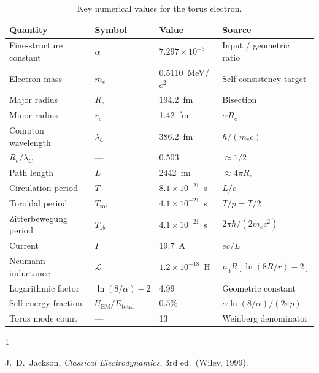 \documentclass[11pt,a4paper]{article}
\begin{document}
\begin{table}[h]
\centering
\begin{tabular}{@{}llll@{}}
\toprule
Quantity & Symbol & Value & Source \\
\midrule
Fine-structure constant & $\alpha$ & $7.297 \times 10^{-3}$ & Input / geometric ratio \\
Electron mass & $m_e$ & 0.5110~MeV/$c^2$ & Self-consistency target \\
Major radius & $R_e$ & 194.2~fm & Bisection \\
Minor radius & $r_e$ & 1.42~fm & $\alpha R_e$ \\
Compton wavelength & $\lambda_C$ & 386.2~fm & $\hbar/(m_e c)$ \\
$R_e / \lambda_C$ & --- & 0.503 & $\approx 1/2$ \\
Path length & $L$ & 2442~fm & $\approx 4\pi R_e$ \\
Circulation period & $T$ & $8.1 \times 10^{-21}$~s & $L/c$ \\
Toroidal period & $T_{\text{tor}}$ & $4.1 \times 10^{-21}$~s & $T/p = T/2$ \\
Zitterbewegung period & $T_{zb}$ & $4.1 \times 10^{-21}$~s & $2\pi\hbar/(2m_e c^2)$ \\
Current & $I$ & 19.7~A & $ec/L$ \\
Neumann inductance & $\mathcal{L}$ & $1.2 \times 10^{-18}$~H & $\mu_0 R[\ln(8R/r)-2]$ \\
Logarithmic factor & $\ln(8/\alpha) - 2$ & 4.99 & Geometric constant \\
Self-energy fraction & $U_{\text{EM}}/E_{\text{total}}$ & 0.5\% & $\alpha \ln(8/\alpha)/(2\pi p)$ \\
Torus mode count & --- & 13 & Weinberg denominator \\
\bottomrule
\end{tabular}
\caption{Key numerical values for the torus electron.}
\label{tab:numerical-values}
\end{table}

\begin{thebibliography}{1}

J.~D.~Jackson,
\emph{Classical Electrodynamics}, 3rd ed.\ (Wiley, 1999).

\end{thebibliography}
\end{document}
